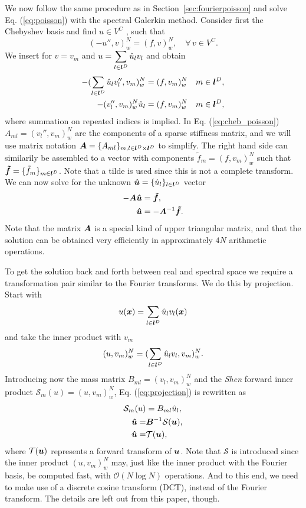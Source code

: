\documentclass[%
oneside,                 %
final,                   %
10pt]{article}
\begin{document}
We now follow the same procedure as in Section~\ref{sec:fourierpoisson} and solve Eq. (\ref{eq:poisson}) with the spectral Galerkin method. Consider first the Chebyshev basis and find $u \in V^C$ , such that
\begin{equation}
(-u'', v)_w^N = (f, v)_w^N , \quad \forall \, v \in V^C.
\end{equation}
We insert for $v=v_m$ and $u=\displaystyle \sum_{l\in \boldsymbol{l}^D} \hat{u}_l v_l$ and obtain
\begin{align}
-(\sum_{l\in \boldsymbol{l}^D} \hat{u}_l v_l'', v_m)_w^N &= (f, v_m)_w^N  &m \in \boldsymbol{l}^D,\\
-(v_l'', v_m)_w^N \hat{u}_l &= (f, v_m)_w^N & m \in \boldsymbol{l}^D, \label{eq:cheb_poisson}
\end{align}
where summation on repeated indices is implied. In Eq. (\ref{eq:cheb_poisson}) $A_{ml} =(v_l'', v_m)_w^N$ are the components of a sparse stiffness matrix, and we will use matrix notation $\boldsymbol{A} = \{A_{ml}\}_{m,l \in \boldsymbol{l}^D \times \boldsymbol{l}^D}$ to simplify. The right hand side can similarily be assembled to a vector with components $\tilde{f}_m = (f, v_m)_w^N$ such that $\boldsymbol{\tilde{f}} = \{\tilde{f}_m\}_{m\in \boldsymbol{l}^D} $. Note that a tilde is used since this is not a complete transform. We can now solve for the unknown $\boldsymbol{\hat{u}} = \{\hat{u}_l\}_{l\in \boldsymbol{l}^D}$ vector
\begin{align}
-\boldsymbol{A} \boldsymbol{\hat{u}} &= \boldsymbol{\tilde{f}}, \\
   \boldsymbol{\hat{u}} &= -\boldsymbol{A}^{-1} \boldsymbol{\tilde{f}}.
\end{align}
Note that the matrix $\boldsymbol{A}$ is a special kind of upper triangular matrix, and that the solution can be obtained very efficiently in approximately $4 N$ arithmetic operations. 

To get the solution back and forth between real and spectral space we require a transformation pair similar to the Fourier transforms. We do this by projection. Start with
\begin{equation}
u(\boldsymbol{x}) = \sum_{l\in \boldsymbol{l}^D} \hat{u}_l v_l(\boldsymbol{x})
\end{equation}
and take the inner product with $v_m$
\begin{equation}
(u, v_m)_w^N  = (\sum_{l\in \boldsymbol{l}^D} \hat{u}_l v_l, v_m)_w^N.
\label{eq:projection}
\end{equation}
Introducing now the mass matrix $B_{ml} = (v_l, v_m)_w^N$ and the \emph{Shen} forward inner product $\mathcal{S}_m(u) = (u, v_m)_w^N$, Eq. (\ref{eq:projection})  is rewritten as
\begin{align}
\mathcal{S}_m(u) &= B_{ml} \hat{u}_l, \\
\boldsymbol{\hat{u}}  =& \boldsymbol{B}^{-1} \mathcal{S}(\boldsymbol{u}) , \\
\boldsymbol{\hat{u}}  =& \mathcal{T}(\boldsymbol{u}) ,
\end{align}
where $\mathcal{T}(\boldsymbol{u})$ represents a forward transform of $\boldsymbol{u}$. Note that $\mathcal{S}$ is introduced since the inner product $(u, v_m)_w^N$ may, just like the inner product with the Fourier basis, be computed fast, with $\mathcal{O}(N \log N)$ operations. And to this end, we need to make use of a discrete cosine transform (DCT), instead of the Fourier transform. The details are left out from this paper, though.
\end{document}
